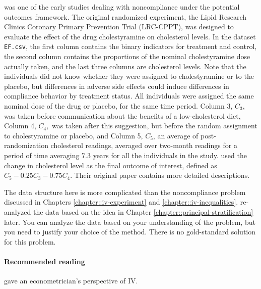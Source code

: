 \citet{efron1991compliance} was one of the early studies dealing with noncompliance under the potential outcomes framework. The original randomized experiment, the Lipid Research Clinics Coronary Primary Prevention Trial (LRC-CPPT), was designed to evaluate the effect of the drug cholestyramine on cholesterol levels.
In the dataset \texttt{EF.csv}, the first column contains the binary indicators for treatment and control, the second column contains the proportions of the nominal cholestyramine dose actually taken, and the last three columns are cholesterol levels.
Note that the individuals did not know whether they were assigned to cholestyramine or to the placebo, but differences in adverse side effects could induce differences in compliance behavior by treatment status. All individuals were assigned the same nominal dose of the drug or placebo, for the same time period.
Column 3, $C_3$, was taken before communication about the benefits of a low-cholesterol diet, Column 4, $C_4,$ was taken after this suggestion, but before the random assignment to cholestyramine or placebo, and Column 5, $C_5$,  an average of post-randomization cholesterol readings, averaged over two-month readings for a period of time averaging 7.3 years for all the individuals in the study. \citet{efron1991compliance} used the change in cholesterol level as the final outcome of interest, defined as $C_5 - 0.25C_3 - 0.75C_4$. Their original paper contains more detailed descriptions. 
 

The data structure here is more complicated than the noncompliance problem discussed in Chapters \ref{chapter::iv-experiment} and \ref{chapter::iv-inequalities}. 
\citet{jin2008principal} re-analyzed the data based on the idea in Chapter \ref{chapter::principal-stratification} later. 
You can analyze the data based on your understanding of the problem, but you need to justify your choice of the method. There is no gold-standard solution for this problem. 




 \paragraph{Recommended reading}


\citet{imbens2014instrumental} gave an econometrician's perspective of IV. 

